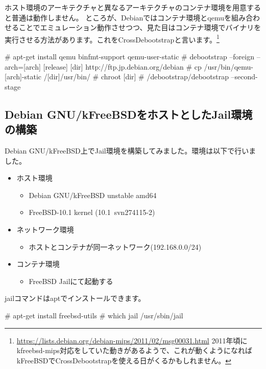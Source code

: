 \documentclass[mingoth,a4paper]{jsarticle}
\begin{document}
ホスト環境のアーキテクチャと異なるアーキテクチャのコンテナ環境を用意すると普通は動作しません。
ところが、Debianではコンテナ環境とqemuを組み合わせることでエミュレーション動作させつつ、見た目はコンテナ環境でバイナリを実行させる方法があります。これをCrossDebootstrapと言います。\footnote{\url{https://lists.debian.org/debian-mips/2011/02/msg00031.html} 2011年頃にkfreebsd-mips対応をしていた動きがあるようで、これが動くようになればkFreeBSDでCrossDebootstrapを使える日がくるかもしれません。}

\begin{commandline}
# apt-get install qemu binfmt-support qemu-user-static
# debootstrap --foreign --arch=[arch] [release] [dir] http://ftp.jp.debian.org/debian
# cp /usr/bin/qemu-[arch]-static /[dir]/usr/bin/
# chroot [dir]
# /debootstrap/debootstrap --second-stage
\end{commandline}

\subsection{Debian GNU/kFreeBSDをホストとしたJail環境の構築}

Debian GNU/kFreeBSD上でJail環境を構築してみました。環境は以下で行いました。

\begin{itemize}
  \item ホスト環境 
  \begin{itemize}
    \item Debian GNU/kFreeBSD unstable amd64
    \item FreeBSD-10.1 kernel (10.1~svn274115-2)
  \end{itemize}
  \item ネットワーク環境 
  \begin{itemize}
    \item ホストとコンテナが同一ネットワーク(192.168.0.0/24)
  \end{itemize}
  \item コンテナ環境
  \begin{itemize}
    \item FreeBSD Jailにて起動する
  \end{itemize}
\end{itemize}

jailコマンドはaptでインストールできます。

\begin{commandline}
# apt-get install freebsd-utils
# which jail
/usr/sbin/jail
\end{commandline}
\end{document}

